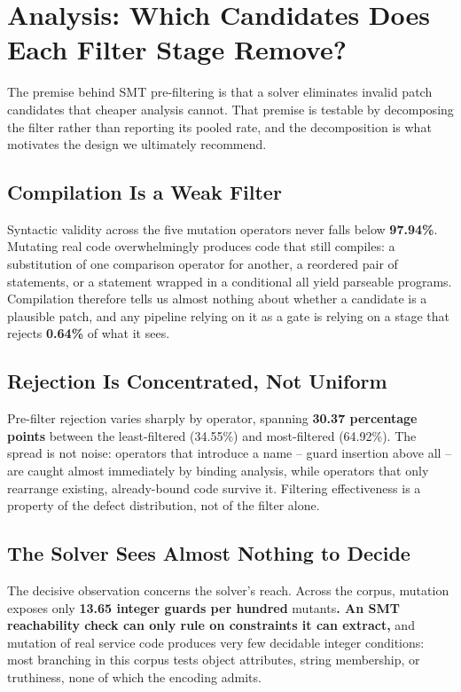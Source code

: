 \documentclass[10pt,twocolumn,letterpaper]{article}
\begin{document}
\section{Analysis: Which Candidates Does Each Filter Stage Remove?}


The premise behind SMT pre-filtering is that a solver eliminates invalid patch
candidates that cheaper analysis cannot. That premise is testable by decomposing
the filter rather than reporting its pooled rate, and the decomposition is what
motivates the design we ultimately recommend.


\subsection{Compilation Is a Weak Filter}


Syntactic validity across the five mutation operators never falls below
\textbf{97.94\%}. Mutating real code overwhelmingly produces
code that still compiles: a substitution of one comparison operator for another, a
reordered pair of statements, or a statement wrapped in a conditional all yield
parseable programs. Compilation therefore tells us almost nothing about whether a
candidate is a plausible patch, and any pipeline relying on it as a gate is relying
on a stage that rejects
\textbf{0.64\%} of what it sees.


\subsection{Rejection Is Concentrated, Not Uniform}


Pre-filter rejection varies sharply by operator, spanning
\textbf{30.37 percentage points} between the
least-filtered (34.55\%) and most-filtered
(64.92\%). The spread is not noise: operators that
introduce a name -- guard insertion above all -- are caught almost immediately by
binding analysis, while operators that only rearrange existing, already-bound code
survive it. Filtering effectiveness is a property of the defect distribution, not
of the filter alone.


\subsection{The Solver Sees Almost Nothing to Decide}


The decisive observation concerns the solver's reach. Across the corpus, mutation
exposes only \textbf{13.65 integer guards per hundred}
mutants\textbf{. An SMT reachability check can only rule on constraints it can extract,}
and mutation of real service code produces very few decidable integer conditions:
most branching in this corpus tests object attributes, string membership, or
truthiness, none of which the encoding admits.
\end{document}
